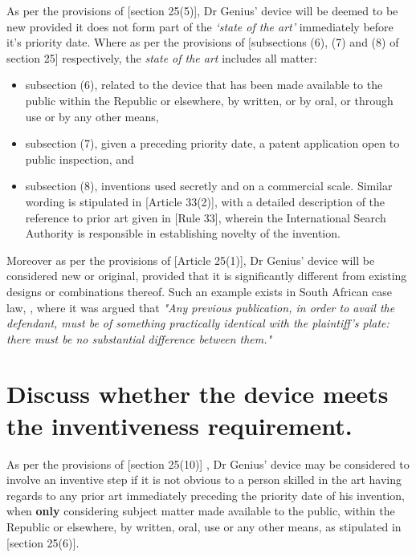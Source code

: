 \documentclass[11pt]{article}
\begin{document}
As per the provisions of [section 25(5)]\cite{rsa78_patents_act}, Dr Genius'
device will be deemed to be new provided it does not form part of the \emph{`state of
the art'} immediately before it's priority date. Where as per the provisions of
[subsections (6), (7) and (8) of section 25]\cite{rsa78_patents_act} respectively,
the \emph{state of the art} includes all matter:
\begin{itemize}
\item subsection (6), related to the device that has been made available to the public within the Republic or elsewhere, by written, or by oral, or through use or by any other means,
\item subsection (7), given a preceding priority date, a patent application open to public inspection, and
\item subsection (8), inventions used secretly and on a commercial scale. Similar wording is stipulated in [Article 33(2)]\cite{wipo70_pct}, with a detailed description of the reference to prior art given in [Rule 33]\cite{wipo70_pct_reg}, wherein the International Search Authority is responsible in establishing novelty of the invention.
\end{itemize}

Moreover as per the provisions of [Article 25(1)]\cite{wto17_trips}, Dr Genius' device will be considered new or original, provided that it is significantly different from existing designs or combinations thereof. Such an example exists in South African case law,  \cite{davis42_levin_v_numplates}, where it was argued that \emph{"Any previous publication, in order to avail the defendant, must be of something practically identical with the plaintiff's plate: there must be no substantial difference between them."}

\section{Discuss whether the device meets the inventiveness requirement.}
\label{sec:org149250a}
\label{sec:inventiveness}

As per the provisions of [section 25(10)] \cite{rsa78_patents_act}, Dr Genius' device may be considered to involve an inventive step if it is not obvious to a person skilled in the art having regards to any prior art immediately preceding the priority date of his invention, when \textbf{only} considering subject matter made available to the public, within the Republic or elsewhere, by written, oral, use or any other means, as stipulated in [section 25(6)]\cite{rsa78_patents_act}.\\
\end{document}
